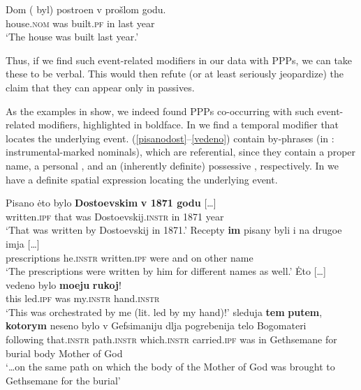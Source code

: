 \documentclass[output=paper,modfonts,newtxmath,hidelinks
\ChapterDOI{10.5281/zenodo.2545513}
]{langscibook}
\begin{document}
\ea\gll	Dom (\hspace{-2pt} byl) postroen v prošlom godu.\\
	house.\textsc{nom} {} was built.\textsc{pf} in last year\\
\glt `The house was built last year.'\label{dom}
\z
	
\noindent Thus, if we find such event-related modifiers in our data with  PPPs, we can take these to be verbal. This would then refute (or at least seriously jeopardize) the claim that they can appear only in  passives. 

As the examples in  show, we indeed found  PPPs co-occurring with such event-related modifiers, highlighted in boldface. In  we find a temporal modifier that locates the underlying event. (\ref{pisanodost}--\ref{vedeno}) contain by-phrases (in : instrumental-marked nominals), which are referential, since they contain a proper name, a personal , and an (inherently definite) possessive , respectively. In  we have a definite spatial expression locating the underlying event.

\ea\label{pisano}
\ea\gll	Pisano \.{e}to bylo \textbf{Dostoevskim} \textbf{v 1871 godu} [\dots]\\ 
	written.\textsc{ipf} that was Dostoevskij.\textsc{instr} {in 1871 year} \\
\glt	`That was written by Dostoevskij in 1871.'\label{pisanodost}
\ex\gll	Recepty \textbf{im} pisany byli i na drugoe imja [\dots]\\ 
	prescriptions he.\textsc{instr} written.\textsc{ipf} were and on other name \\ 
\glt	`The prescriptions were written by him for different names as well.'\label{pisanoim}
\ex\gll 	\.{E}to [\dots] vedeno bylo \textbf{moeju} \textbf{rukoj}!\\
	this {} led.\textsc{ipf} was my.\textsc{instr} hand.\textsc{instr}\\
\glt	`This was orchestrated by me (lit. led by my hand)!'\label{vedeno} 
\ex\gll	[\dots] sleduja \textbf{tem} \textbf{putem}, \textbf{kotorym} neseno bylo v Gefsimaniju dlja pogrebenija telo Bogomateri\\
	{} following that.\textsc{instr} path.\textsc{instr} which.\textsc{instr} carried.\textsc{ipf} was in Gethsemane for burial body {Mother of God} \\
\glt	`\dots on the same path on which the body of the Mother of God was brought to Gethsemane for the burial'\label{Sion}
\z\z
\end{document}
